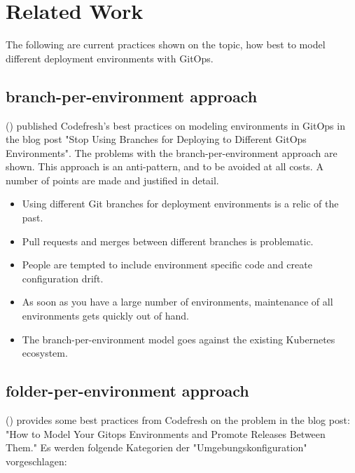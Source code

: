 \chapter{Related Work}

The following are current practices
shown on the topic,
how best to model different deployment environments with GitOps.


\section{branch-per-environment approach}

\citeauthor{codefreshStopUsingBranchesGitOpsEnvironments} (\citeyear{codefreshStopUsingBranchesGitOpsEnvironments})
published Codefresh's best practices on modeling environments in GitOps 
in the blog post "Stop Using Branches for Deploying to Different GitOps Environments".
The problems with the branch-per-environment approach are shown.
This approach is an anti-pattern,
and to be avoided at all costs.
A number of points are made and justified in detail.

\begin{itemize}
	\item Using different Git branches for deployment environments is a relic of the past.
	\item Pull requests and merges between different branches is problematic.
	\item People are tempted to include environment specific code and create configuration drift.
	\item As soon as you have a large number of environments, maintenance of all environments gets quickly out of hand.
	\item The branch-per-environment model goes against the existing Kubernetes ecosystem.
\end{itemize}

\noindent
\autocite{codefreshStopUsingBranchesGitOpsEnvironments}


\section{folder-per-environment approach}

\citeauthor{codefreshHowToModelGitOpsEnvironmentsAndPromote} (\citeyear{codefreshHowToModelGitOpsEnvironmentsAndPromote})
provides some best practices from Codefresh on the problem in the blog post: "How to Model Your Gitops Environments and Promote Releases Between Them."
%
Es werden folgende Kategorien der "Umgebungskonfiguration" vorgeschlagen:

